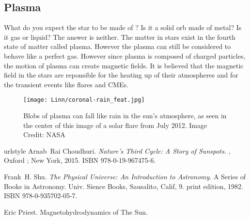 \documentclass{../template/texnote}
\begin{document}
\subsection{Plasma}
What do you expect the star to be made of ? Is it a solid orb made of metal? Is it gas or liquid? The answer is neither. The matter in stars exist in the fourth state of matter called plasma.
However the plasma can still be considered to behave like a perfect gas.
However since plasma is composed of charged particles, the motion of plasma can create magnetic fields.
It is believed that the magnetic field in the stars are reponsible for the heating up of their atmospheres and for the transient events like flares and CMEs.
    \begin{figure}
    \begin{center}
	\texttt{[image: Linn/coronal-rain\_feat.jpg]}
    \end{center}
    \caption{Blobs of plasma can fall like rain in the sun’s atmosphere, as seen in the center of this image of a solar flare from July 2012. Image Credit: NASA}
    \label{fig:plasma}
    \end{figure}



\begin{thebibliography}{4}
\providecommand{\natexlab}[1]{#1}
\providecommand{\url}[1]{\texttt{#1}}
\expandafter\ifx\csname urlstyle\endcsname\relax
  \providecommand{\doi}[1]{doi: #1}\else
  \providecommand{\doi}{doi: \begingroup \urlstyle{rm}\Url}\fi
{}
Arnab~Rai Choudhuri.
\newblock \emph{Nature's Third Cycle: A Story of Sunspots}.
, {Oxford ; New York}, 2015.
\newblock ISBN 978-0-19-967475-6.

Frank~H. Shu.
\newblock \emph{The Physical Universe: An Introduction to Astronomy}.
\newblock A Series of Books in Astronomy. {Univ. Sience Books}, {Sausalito,
  Calif}, 9. print edition, 1982.
\newblock ISBN 978-0-935702-05-7.

Eric Priest.
\newblock Magnetohydrodynamics of {{The Sun}}.

\end{thebibliography}
\vspace{0.5cm}
\noindent{}
    \printbibliography
\end{document}
